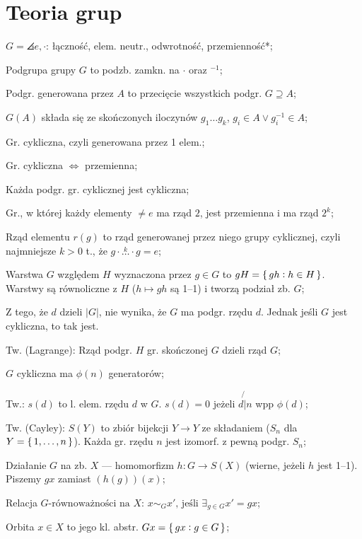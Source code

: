 \section{Teoria grup}

$G = \angles{e, \cdot}$: łączność, elem. neutr., odwrotność, przemienność*;

Podgrupa grupy $G$ to podzb. zamkn. na $\cdot$ oraz $^{-1}$;

Podgr. generowana przez $A$ to przecięcie wszystkich podgr. $G \supseteq A$;

$G(A)$ składa się ze skończonych iloczynów $g_1\dots g_k$,
  $g_i\in A \lor g_i^{-1} \in A$;

Gr. cykliczna, czyli generowana przez 1 elem.;

Gr. cykliczna $\Leftrightarrow$ przemienna;

Każda podgr. gr. cyklicznej jest cykliczna;

Gr., w której każdy elementy $\neq e$ ma rząd $2$, jest przemienna
  i ma rząd $2^k$;

Rząd elementu $r(g)$ to rząd generowanej przez niego grupy cyklicznej, czyli
najmniejsze $k > 0$ t., że $g\cdot\overset{k}{\ldots}\cdot g=e$;

Warstwa $G$ względem $H$ wyznaczona przez $g\in G$ to
  $gH = \set{gh : h \in H}$. Warstwy są równoliczne z $H$
  ($h \mapsto gh$ są 1--1) i tworzą podział zb. $G$;

Z tego, że $d$ dzieli $|G|$, nie wynika, że $G$ ma podgr. rzędu $d$. Jednak
jeśli $G$ jest cykliczna, to tak jest.

Tw. (Lagrange): Rząd podgr. $H$ gr. skończonej $G$ dzieli rząd $G$;

$G$ cykliczna ma $\phi(n)$ generatorów;

Tw.: $s(d)$ to l. elem. rzędu $d$ w $G$. $s(d) = 0$ jeżeli $d \not{|} n$
  wpp $\phi(d)$;

Tw. (Cayley): $S(Y)$ to zbiór bijekcji $Y \rightarrow Y$ ze składaniem
  ($S_n$ dla $Y=\set{1,\dots,n}$). Każda gr. rzędu $n$ jest izomorf. z pewną
  podgr. $S_n$;

Działanie $G$ na zb. $X$ --- homomorfizm $h: G \rightarrow S(X)$ (wierne,
jeżeli $h$ jest 1--1). Piszemy $gx$ zamiast $(h(g))(x)$;

Relacja $G\text{-równoważności na } X$:
  $x \sim_G x' \text{, jeśli } \exists_{g\in G} x' = gx$;

Orbita $x \in X$ to jego kl. abstr. $Gx=\set{gx:g\in G}$;

